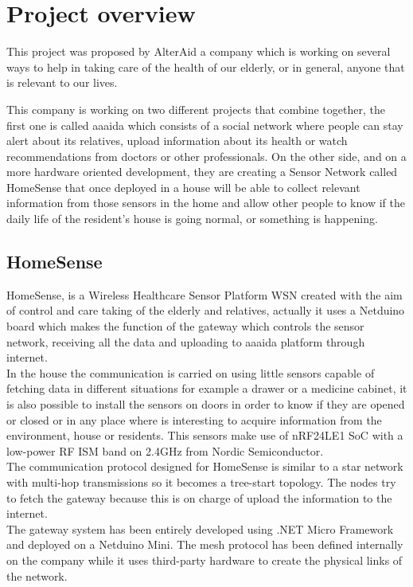 \chapter{Project overview}\label{C:project-overview}
This project was proposed by AlterAid a company which is working on several ways to help in taking care of the health of our elderly, or in general, anyone that is relevant to our lives.

This company is working on two different projects that combine together, the first one is called aaaida which consists of a social network where people can stay alert about its relatives, upload information about its health or watch recommendations from doctors or other professionals. On the other side, and on a more hardware oriented development, they are creating a Sensor Network called HomeSense that once deployed in a house will be able to collect relevant information from those sensors in the home and allow other people to know if the daily life of the resident's house is going normal, or something is happening.

\section{HomeSense}\label{S:HomeSense}
HomeSense, is a Wireless Healthcare Sensor Platform \gls{WSN} created with the aim of control and care taking of the elderly and relatives, actually it uses a Netduino board which makes the function of the gateway which controls the sensor network, receiving all the data and uploading to aaaida platform through internet.
\\
In the house the communication is carried on using little sensors capable of fetching data in different situations for example a drawer or a medicine cabinet, it is also possible to install the sensors on doors in order to know if they are opened or closed or in any place where is interesting to acquire information from the environment, house or residents. This sensors make use of nRF24LE1 \gls{SoC} with a low-power RF \gls{ISM} band on 2.4GHz from Nordic Semiconductor.
\\
The communication protocol designed for HomeSense is similar to a star network with multi-hop transmissions so it becomes a tree-start topology. The nodes try to fetch the gateway because this is on charge of upload the information to the internet.
\\
The gateway system has been entirely developed using .NET Micro Framework and deployed on a Netduino Mini. The mesh protocol has been defined internally on the company while it uses third-party hardware to create the physical links of the network.

